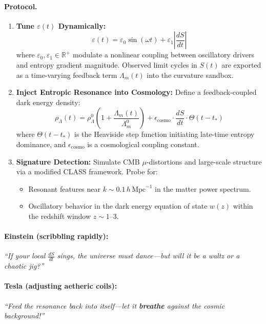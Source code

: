 \documentclass[12pt]{article}
\theoremstyle{plain}
\begin{document}
\paragraph{Protocol.}
\begin{enumerate}
    \item \textbf{Tune $\varepsilon(t)$ Dynamically:}
    \begin{equation}
        \varepsilon(t) = \varepsilon_0 \sin(\omega t) + \varepsilon_1 \left| \frac{dS}{dt} \right|
    \end{equation}
    where $\varepsilon_0, \varepsilon_1 \in \mathbb{R}^+$ modulate a nonlinear coupling between oscillatory drivers and entropy gradient magnitude. Observed limit cycles in $S(t)$ are exported as a time-varying feedback term $\Lambda_m(t)$ into the curvature sandbox.
    
    \item \textbf{Inject Entropic Resonance into Cosmology:}
    Define a feedback-coupled dark energy density:
    \begin{equation}
        \rho_\Lambda(t) = \rho_\Lambda^0 \left( 1 + \frac{\Lambda_m(t)}{\Lambda_m^0} \right) + \epsilon_{\text{cosmo}} \cdot \frac{dS}{dt} \cdot \Theta(t - t_*)
    \end{equation}
    where $\Theta(t - t_*)$ is the Heaviside step function initiating late-time entropy dominance, and $\epsilon_{\text{cosmo}}$ is a cosmological coupling constant.
    
    \item \textbf{Signature Detection:}
    Simulate CMB $\mu$-distortions and large-scale structure via a modified CLASS framework. Probe for:
    \begin{itemize}
        \item Resonant features near $k \sim 0.1\,h\,\text{Mpc}^{-1}$ in the matter power spectrum.
        \item Oscillatory behavior in the dark energy equation of state $w(z)$ within the redshift window $z \sim 1$–$3$.
    \end{itemize}
\end{enumerate}

\paragraph{Einstein (scribbling rapidly):}
\emph{“If your local $\frac{dS}{dt}$ sings, the universe must dance—but will it be a waltz or a chaotic jig?”}

\paragraph{Tesla (adjusting aetheric coils):}
\emph{“Feed the resonance back into itself—let it \textbf{breathe} against the cosmic background!”}
\end{document}
